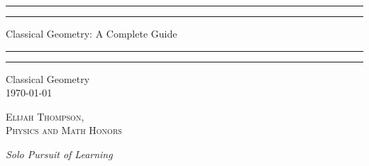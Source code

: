 \documentclass[12pt, a4paper, oneside, openright, titlepage]{book}
\begin{document}

\begin{titlepage}
    \centering
    \scshape
    \vspace*{\baselineskip}
    \rule{\textwidth}{1.6pt}\vspace*{-\baselineskip}\vspace*{2pt}
    \rule{\textwidth}{0.4pt}
    
    \vspace{0.75\baselineskip}
    
    {\LARGE Classical Geometry: A Complete Guide}
    
    \vspace{0.75\baselineskip}
    
    \rule{\textwidth}{0.4pt}\vspace*{-\baselineskip}\vspace{3.2pt}
    \rule{\textwidth}{1.6pt}
    
    \vspace{2\baselineskip}
    Classical Geometry \\
    \vspace*{3\baselineskip}
    \monthdayyeardate\today \\
    \vspace*{5.0\baselineskip}
    
    {\scshape\Large Elijah Thompson, \\ Physics and Math Honors\\}
    
    \vspace{1.0\baselineskip}
    \textit{Solo Pursuit of Learning}
    \vfill
    \enlargethispage{1in}
    \begin{figure}[b!]
    \end{figure}
\end{titlepage}
\end{document}
